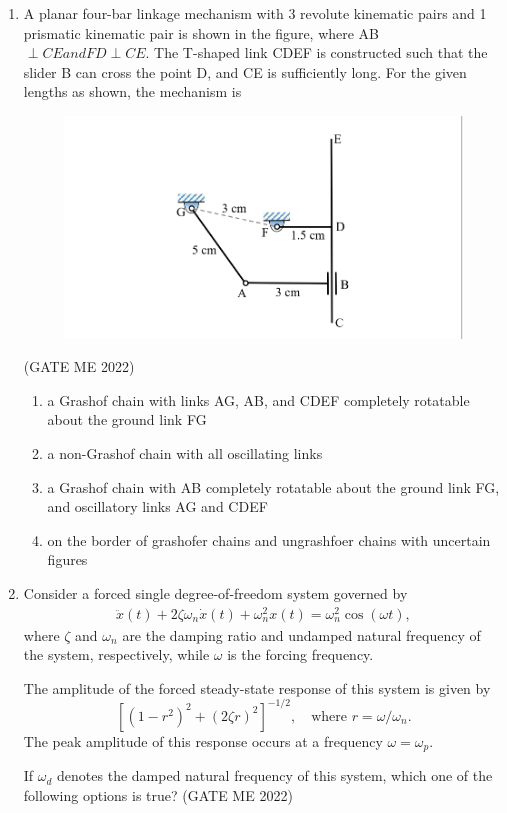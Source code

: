 \documentclass[journal]{IEEEtran}
\numberwithin{equation}{enumi}
\numberwithin{figure}{enumi}
\begin{document}
\begin{enumerate}
\item A planar four-bar linkage mechanism with 3 revolute kinematic pairs and 1 prismatic kinematic pair is shown in the figure, where AB $\perp CE and FD \perp CE$. The T-shaped link CDEF is constructed such that the slider B can cross the point D, and CE is sufficiently long. For the given lengths as shown, the mechanism is 
    \begin{figure}[H]
    \centering
    \includegraphics[width = 0.5\columnwidth]{figs/fig4.12.png}
    \caption*{}
    \label{fig:Q38}
    \end{figure}
    \hfill{(GATE ME 2022)}
\begin{enumerate}
  
\item a Grashof chain with links AG, AB, and CDEF completely rotatable about the ground link FG
\item a non-Grashof chain with all oscillating links 
\item a Grashof chain with AB completely rotatable about the ground link FG, and oscillatory links AG and CDEF
\item on the border of grashofer chains and ungrashfoer chains with uncertain figures
\end{enumerate}
\item Consider a forced single degree-of-freedom system governed by
\begin{align*}
\ddot{x}(t) + 2\zeta \omega_n \dot{x}(t) + \omega_n^2 x(t) = \omega_n^2 \cos(\omega t),
\end{align*}
where $\zeta$ and $\omega_n$ are the damping ratio and undamped natural frequency of the system, respectively, while $\omega$ is the forcing frequency.

The amplitude of the forced steady-state response of this system is given by
\[
\left[(1 - r^2)^2 + (2\zeta r)^2 \right]^{-1/2}, \quad \text{where } r = \omega/\omega_n.
\]
The peak amplitude of this response occurs at a frequency $\omega = \omega_p$.

If $\omega_d$ denotes the damped natural frequency of this system, which one of the following options is true?
\hfill{(GATE ME 2022)}
\begin{enumerate}
  

\end{enumerate}
\end{enumerate}
\end{document}
